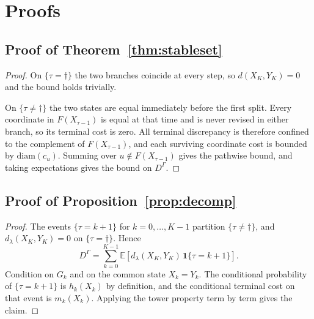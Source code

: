 \documentclass[11pt,a4paper]{article}
\theoremstyle{plain}
\theoremstyle{definition}
\theoremstyle{remark}
\newcommand{\Ind}[1]{\mathbf{1}\{#1\}}
\newcommand{\Ex}{\mathbb{E}}
\newcommand{\diam}{\mathrm{diam}}
\begin{document}
\section{Proofs}
\label{app:proofs}

\subsection{Proof of Theorem~\ref{thm:stableset}}
\begin{proof}
On $\{\tau = \dagger\}$ the two branches coincide at every step, so
$d(X_K,Y_K)=0$ and the bound holds trivially.

On $\{\tau \neq \dagger\}$ the two states are equal immediately before the first
split. Every coordinate in $F(X_{\tau-1})$ is equal at that time and is never
revised in either branch, so its terminal cost is zero. All terminal discrepancy
is therefore confined to the complement of $F(X_{\tau-1})$, and each surviving
coordinate cost is bounded by $\diam(c_u)$. Summing over $u \notin F(X_{\tau-1})$
gives the pathwise bound, and taking expectations gives the bound on $D^\Gamma$.
\end{proof}

\subsection{Proof of Proposition~\ref{prop:decomp}}
\begin{proof}
The events $\{\tau = k+1\}$ for $k = 0,\dots,K-1$ partition
$\{\tau \neq \dagger\}$, and $d_\lambda(X_K,Y_K)=0$ on $\{\tau=\dagger\}$. Hence
\[
  D^\Gamma = \sum_{k=0}^{K-1}
    \Ex\!\left[d_\lambda(X_K,Y_K)\,\Ind{\tau = k+1}\right].
\]
Condition on $G_k$ and on the common state $X_k=Y_k$. The conditional probability
of $\{\tau = k+1\}$ is $h_k(X_k)$ by definition, and the conditional terminal
cost on that event is $m_k(X_k)$. Applying the tower property term by term gives
the claim.
\end{proof}
\end{document}
